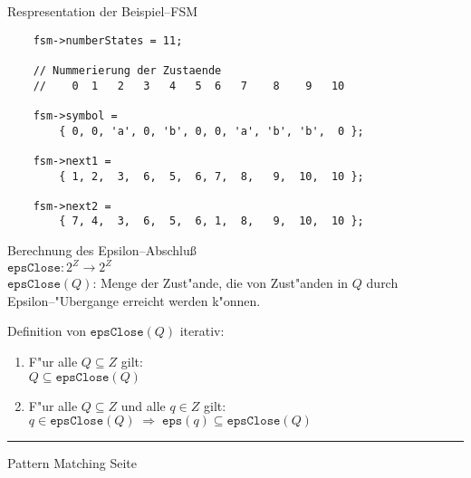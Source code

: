 
\begin{slide}{}
\normalsize

\begin{center}
Respresentation der Beispiel--FSM
\end{center}
\vspace*{0.5cm}

\footnotesize
\begin{verbatim}
    fsm->numberStates = 11;

    // Nummerierung der Zustaende
    //    0  1   2   3   4   5  6   7    8    9   10

    fsm->symbol = 
        { 0, 0, 'a', 0, 'b', 0, 0, 'a', 'b', 'b',  0 };

    fsm->next1 = 
        { 1, 2,  3,  6,  5,  6, 7,  8,   9,  10,  10 };
    
    fsm->next2 = 
        { 7, 4,  3,  6,  5,  6, 1,  8,   9,  10,  10 };
\end{verbatim}
\vspace*{0.5cm}

Berechnung des Epsilon--Abschlu{\ss} \\[0.3cm]
\hspace*{1.3cm} $\mathtt{epsClose}: 2^Z \rightarrow 2^Z$ \\[0.3cm]
$\mathtt{epsClose}(Q)$: Menge der Zust"ande, die von Zust"anden in $Q$ durch
Epsilon--"Ubergange erreicht werden k"onnen.

Definition von $\mathtt{epsClose}(Q)$ iterativ:
\begin{enumerate}
\item F"ur alle $Q \subseteq Z$ gilt: \\[0.3cm]
      \hspace*{1.3cm} $Q \subseteq \mathtt{epsClose}(Q)$
\item F"ur alle $Q \subseteq Z$ und alle $q \in Z$ gilt: \\[0.3cm]
      $q \in \mathtt{epsClose}(Q) \;\Rightarrow\; \mathtt{eps}(q) \subseteq \mathtt{epsClose}(Q)$
\end{enumerate}

\vspace*{\fill}
\tiny \addtocounter{mypage}{1}
\rule{17cm}{1mm}
Pattern Matching \hspace*{\fill} Seite 
\end{slide}


